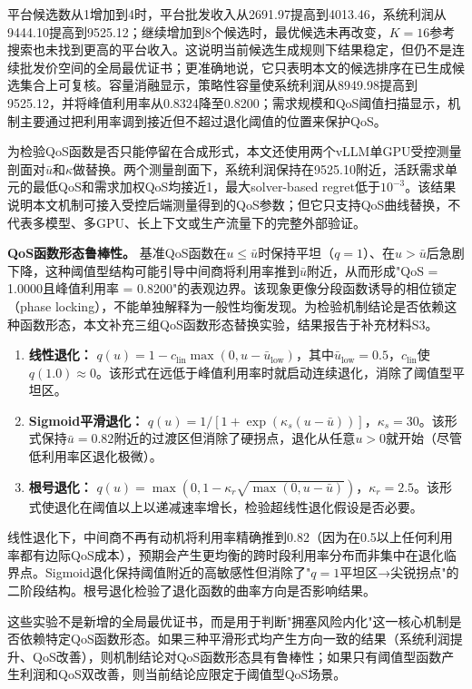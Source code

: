 \documentclass[UTF8,11pt]{ctexart}
\begin{document}
平台候选数从1增加到4时，平台批发收入从2691.97提高到4013.46，系统利润从9444.10提高到9525.12；继续增加到8个候选时，最优候选未再改变，$K=16$参考搜索也未找到更高的平台收入。这说明当前候选生成规则下结果稳定，但仍不是连续批发价空间的全局最优证书；更准确地说，它只表明本文的候选排序在已生成候选集合上可复核。容量消融显示，策略性容量使系统利润从8949.98提高到9525.12，并将峰值利用率从0.8324降至0.8200；需求规模和QoS阈值扫描显示，机制主要通过把利用率调到接近但不超过退化阈值的位置来保护QoS。

为检验QoS函数是否只能停留在合成形式，本文还使用两个vLLM单GPU受控测量剖面对$\bar u$和$\kappa$做替换。两个测量剖面下，系统利润保持在9525.10附近，活跃需求单元的最低QoS和需求加权QoS均接近1，最大solver-based regret低于$10^{-3}$。该结果说明本文机制可接入受控后端测量得到的QoS参数；但它只支持QoS曲线替换，不代表多模型、多GPU、长上下文或生产流量下的完整外部验证。

\textbf{QoS函数形态鲁棒性。} 基准QoS函数在$u\le\bar u$时保持平坦（$q=1$）、在$u>\bar u$后急剧下降，这种阈值型结构可能引导中间商将利用率推到$\bar u$附近，从而形成"QoS = 1.0000且峰值利用率 = 0.8200"的表观边界。该现象更像分段函数诱导的相位锁定（phase locking），不能单独解释为一般性均衡发现。为检验机制结论是否依赖这种函数形态，本文补充三组QoS函数形态替换实验，结果报告于补充材料S3。

\begin{enumerate}[leftmargin=2em]
  \item \textbf{线性退化：} $q(u)=1-c_{\text{lin}}\max(0,u-\bar u_{\text{low}})$，其中$\bar u_{\text{low}}=0.5$，$c_{\text{lin}}$使$q(1.0)\approx 0$。该形式在远低于峰值利用率时就启动连续退化，消除了阈值型平坦区。
  \item \textbf{Sigmoid平滑退化：} $q(u)=1/[1+\exp(\kappa_s(u-\bar u))]$，$\kappa_s=30$。该形式保持$\bar u=0.82$附近的过渡区但消除了硬拐点，退化从任意$u>0$就开始（尽管低利用率区退化极微）。
  \item \textbf{根号退化：} $q(u)=\max(0,1-\kappa_r\sqrt{\max(0,u-\bar u)})$，$\kappa_r=2.5$。该形式使退化在阈值以上以递减速率增长，检验超线性退化假设是否必要。
\end{enumerate}

线性退化下，中间商不再有动机将利用率精确推到0.82（因为在0.5以上任何利用率都有边际QoS成本），预期会产生更均衡的跨时段利用率分布而非集中在退化临界点。Sigmoid退化保持阈值附近的高敏感性但消除了"$q=1$平坦区→尖锐拐点"的二阶段结构。根号退化检验了退化函数的曲率方向是否影响结果。

这些实验不是新增的全局最优证书，而是用于判断"拥塞风险内化"这一核心机制是否依赖特定QoS函数形态。如果三种平滑形式均产生方向一致的结果（系统利润提升、QoS改善），则机制结论对QoS函数形态具有鲁棒性；如果只有阈值型函数产生利润和QoS双改善，则当前结论应限定于阈值型QoS场景。
\end{document}
